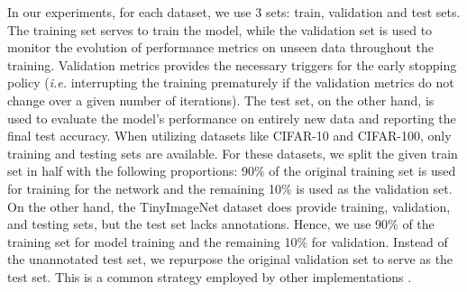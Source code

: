 In our experiments, for each dataset, we use 3 sets: train, validation and test
sets. The training set serves to train the model, while the validation set is
used to monitor the evolution of performance metrics on unseen data throughout
the training. Validation metrics provides the necessary triggers for the early
stopping policy (\emph{i.e.} interrupting the training prematurely if the
validation metrics do not change over a given number of iterations). The test
set, on the other hand, is used to evaluate the model's performance on entirely
new data and reporting the final test accuracy. When utilizing datasets like
CIFAR-10 and CIFAR-100, only training and testing sets are available. For these
datasets, we split the given train set in half with the following proportions:
90\% of the original training set is used for training for the network and the
remaining 10\% is used as the validation set. On the other hand, the
TinyImageNet dataset does provide training, validation, and testing sets, but
the test set lacks annotations. Hence, we use 90\% of the training set for model
training and the remaining 10\% for validation. Instead of the unannotated test
set, we repurpose the original validation set to serve as the test set. This is
a common strategy employed by other implementations
\cite{hanyuanxu2018tinyimagenet,nbdt,alvinwan2020nbdt}.\\
